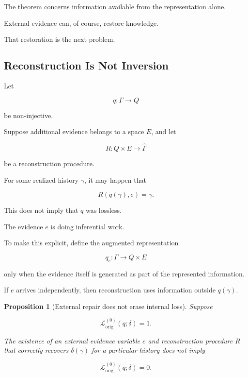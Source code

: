 \documentclass[
  11pt,
  a4paper,
  DIV=12,
  BCOR=0mm,
  parskip=half-
]{scrartcl}
\newcommand{\lossorig}{%
  \mathscr L_{\mathrm{orig}}%
}
\theoremstyle{definition}
\theoremstyle{plain}
\newtheorem{proposition}[definition]{Proposition}
\theoremstyle{remark}
\begin{document}
The theorem concerns information available from the representation alone.

External evidence can, of course, restore knowledge.

That restoration is the next problem.


\subsection{Reconstruction Is Not Inversion}
\label{app:reconstruction-not-inversion}

Let

\[
  q:\Gamma\to Q
\]

be non-injective.

Suppose additional evidence belongs to a space \(E\), and let

\[
  R:Q\times E\to\widehat\Gamma
\]

be a reconstruction procedure.

For some realized history \(\gamma\), it may happen that

\[
  R(q(\gamma),e)=\gamma.
\]

This does not imply that \(q\) was lossless.

The evidence \(e\) is doing inferential work.

To make this explicit, define the augmented representation

\[
  q_e:\Gamma\to Q\times E
\]

only when the evidence itself is generated as part of the represented
information.

If \(e\) arrives independently, then reconstruction uses information outside
\(q(\gamma)\).

\begin{proposition}[External repair does not erase internal loss]
\label{prop:external-repair}
Suppose

\[
  \lossorig^{(0)}(q;\delta)=1.
\]

The existence of an external evidence variable \(e\) and reconstruction
procedure \(R\) that correctly recovers \(\delta(\gamma)\) for a particular
history does not imply

\[
  \lossorig^{(0)}(q;\delta)=0.
\]
\end{proposition}
\end{document}

